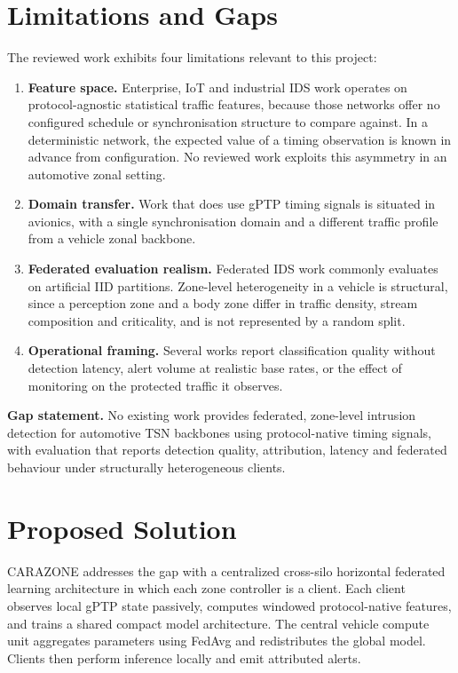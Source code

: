 \section{Limitations and Gaps}
\label{sec:limitations-gaps}

The reviewed work exhibits four limitations relevant to this project:

\begin{enumerate}
  \item \textbf{Feature space.} Enterprise, IoT and industrial IDS work operates on
        protocol-agnostic statistical traffic features, because those networks offer
        no configured schedule or synchronisation structure to compare against. In a
        deterministic network, the expected value of a timing observation is known in
        advance from configuration. No reviewed work exploits this asymmetry in an
        automotive zonal setting.
  \item \textbf{Domain transfer.} Work that does use gPTP timing signals is situated
        in avionics, with a single synchronisation domain and a different traffic
        profile from a vehicle zonal backbone.
  \item \textbf{Federated evaluation realism.} Federated IDS work commonly evaluates
        on artificial IID partitions. Zone-level heterogeneity in a vehicle is
        structural, since a perception zone and a body zone differ in traffic density,
        stream composition and criticality, and is not represented by a random
        split.
  \item \textbf{Operational framing.} Several works report classification quality
        without detection latency, alert volume at realistic base rates, or the
        effect of monitoring on the protected traffic it observes.
\end{enumerate}

\textbf{Gap statement.} No existing work provides federated, zone-level intrusion
detection for automotive TSN backbones using protocol-native timing signals, with
evaluation that reports detection quality, attribution, latency and federated
behaviour under structurally heterogeneous clients.

\section{Proposed Solution}
CARAZONE addresses the gap with a centralized cross-silo horizontal federated
learning architecture in which each zone controller is a client. Each client
observes local gPTP state passively, computes windowed protocol-native features,
and trains a shared compact model architecture. The central vehicle compute unit
aggregates parameters using FedAvg and redistributes the global model. Clients then
perform inference locally and emit attributed alerts.

